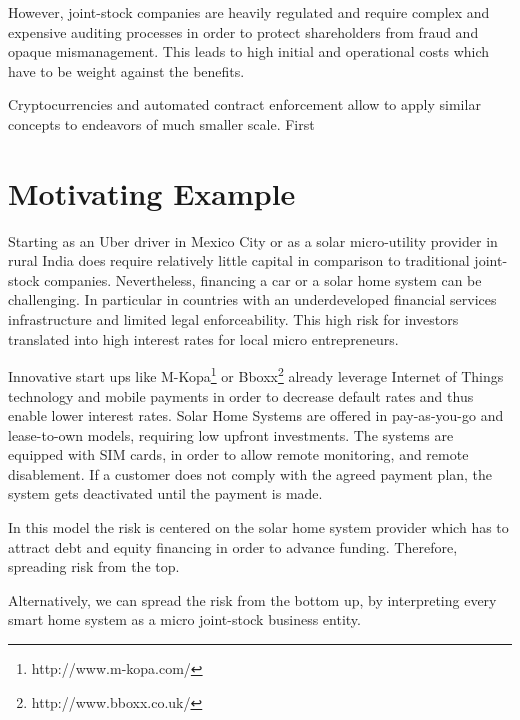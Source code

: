 However, joint-stock companies are heavily regulated and require complex and expensive auditing processes in order to protect shareholders from fraud and opaque mismanagement. This leads to high initial and operational costs which have to be weight against the benefits.

Cryptocurrencies and automated contract enforcement allow to apply similar concepts to endeavors of much smaller scale. First 
\section{Motivating Example}

Starting as an Uber driver in Mexico City or as a solar micro-utility provider in rural India does require relatively little capital in comparison to traditional joint-stock companies. 
Nevertheless, financing a car or a solar home system can be challenging. In particular in countries with an underdeveloped financial services infrastructure and limited legal enforceability. This high risk for investors translated into high interest rates for local micro entrepreneurs. 

Innovative start ups like M-Kopa\footnote{http://www.m-kopa.com/} or Bboxx\footnote{http://www.bboxx.co.uk/} already leverage Internet of Things technology and mobile payments in order to decrease default rates and thus enable lower interest rates. Solar Home Systems are offered in pay-as-you-go and lease-to-own models, requiring low upfront investments. The systems are equipped with SIM cards, in order to allow remote monitoring, and remote disablement. If a customer does not comply with the agreed payment plan, the system gets deactivated until the payment is made. 

In this model the risk is centered on the solar home system provider which has to attract debt and equity financing in order to advance funding. Therefore, spreading risk from the top.

Alternatively, we can spread the risk from the bottom up, by interpreting every smart home system as a micro joint-stock business entity.



